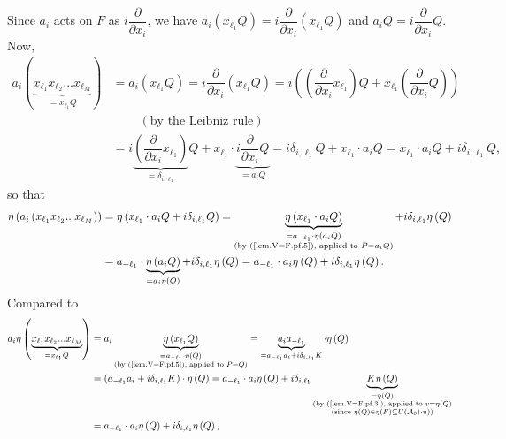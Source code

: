 \documentclass[etingof-lie.tex]{subfiles}
\begin{document}
Since $a_{i}$ acts on $F$ as $i\dfrac{\partial}{\partial x_{i}}$, we have
$a_{i}\left(  x_{\ell_{1}}Q\right)  =i\dfrac{\partial}{\partial x_{i}}\left(
x_{\ell_{1}}Q\right)  $ and $a_{i}Q=i\dfrac{\partial}{\partial x_{i}}Q$. Now,%
\begin{align*}
a_{i}\left(  \underbrace{x_{\ell_{1}}x_{\ell_{2}}...x_{\ell_{M}}}%
_{=x_{\ell_{1}}Q}\right)   &  =a_{i}\left(  x_{\ell_{1}}Q\right)
=i\dfrac{\partial}{\partial x_{i}}\left(  x_{\ell_{1}}Q\right)  =i\left(
\left(  \dfrac{\partial}{\partial x_{i}}x_{\ell_{1}}\right)  Q+x_{\ell_{1}%
}\left(  \dfrac{\partial}{\partial x_{i}}Q\right)  \right) \\
&  \ \ \ \ \ \ \ \ \ \ \left(  \text{by the Leibniz rule}\right) \\
&  =i\underbrace{\left(  \dfrac{\partial}{\partial x_{i}}x_{\ell_{1}}\right)
}_{=\delta_{i,\ell_{1}}}Q+x_{\ell_{1}}\cdot\underbrace{i\dfrac{\partial
}{\partial x_{i}}Q}_{=a_{i}Q}=i\delta_{i,\ell_{1}}Q+x_{\ell_{1}}\cdot
a_{i}Q=x_{\ell_{1}}\cdot a_{i}Q+i\delta_{i,\ell_{1}}Q,
\end{align*}
so that%
\begin{align*}
\eta\left(  a_{i}\left(  x_{\ell_{1}}x_{\ell_{2}}...x_{\ell_{M}}\right)
\right)   &  =\eta\left(  x_{\ell_{1}}\cdot a_{i}Q+i\delta_{i,\ell_{1}%
}Q\right)  =\underbrace{\eta\left(  x_{\ell_{1}}\cdot a_{i}Q\right)
}_{\substack{=a_{-\ell_{1}}\cdot\eta\left(  a_{i}Q\right)  \\\text{(by
(\ref{lem.V=F.pf.5}), applied to }P=a_{i}Q\text{)}}}+i\delta_{i,\ell_{1}}%
\eta\left(  Q\right) \\
&  =a_{-\ell_{1}}\cdot\underbrace{\eta\left(  a_{i}Q\right)  }_{=a_{i}%
\eta\left(  Q\right)  }+i\delta_{i,\ell_{1}}\eta\left(  Q\right)
=a_{-\ell_{1}}\cdot a_{i}\eta\left(  Q\right)  +i\delta_{i,\ell_{1}}%
\eta\left(  Q\right)  .
\end{align*}
Compared to%
\begin{align*}
a_{i}\eta\left(  \underbrace{x_{\ell_{1}}x_{\ell_{2}}...x_{\ell_{M}}%
}_{=x_{\ell_{1}}Q}\right)   &  =a_{i}\underbrace{\eta\left(  x_{\ell_{1}%
}Q\right)  }_{\substack{=a_{-\ell_{1}}\cdot\eta\left(  Q\right)  \\\text{(by
(\ref{lem.V=F.pf.5}), applied to }P=Q\text{)}}}=\underbrace{a_{i}a_{-\ell_{1}%
}}_{=a_{-\ell_{1}}a_{i}+i\delta_{i,\ell_{1}}K}\cdot\eta\left(  Q\right) \\
&  =\left(  a_{-\ell_{1}}a_{i}+i\delta_{i,\ell_{1}}K\right)  \cdot\eta\left(
Q\right)  =a_{-\ell_{1}}\cdot a_{i}\eta\left(  Q\right)  +i\delta_{i,\ell_{1}%
}\underbrace{K\eta\left(  Q\right)  }_{\substack{=\eta\left(  Q\right)
\\\text{(by (\ref{lem.V=F.pf.3}), applied to }v=\eta\left(  Q\right)
\\\text{(since }\eta\left(  Q\right)  \in\eta\left(  F\right)  \subseteq
U\left(  \mathcal{A}_{0}\right)  \cdot u\text{))}}}\\
&  =a_{-\ell_{1}}\cdot a_{i}\eta\left(  Q\right)  +i\delta_{i,\ell_{1}}%
\eta\left(  Q\right)  ,
\end{align*}
\end{document}
